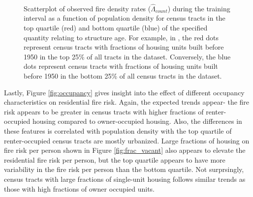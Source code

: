 \documentclass{svjour3}
\begin{document}
\begin{figure}[!ht]
\begin{center}
{          }
            \\
          
      \end{center}
      \caption{Scatterplot of observed fire density rates ($\hat\Lambda_{count}$) during the training interval as a function of population density for census tracts in the top quartile (red) and bottom quartile (blue) of the specified quantity relating to structure age. For example, in \protect{}, the red dots represent census tracts with fractions of housing units built before 1950 in the top 25\% of all tracts in the dataset. Conversely, the blue dots represent census tracts with fractions of housing units built before 1950 in the bottom 25\% of all census tracts in the dataset.}
     \label{fig:building age}
  \end{figure}
 
    Lastly, Figure \ref{fig:occupancy} gives insight into the effect of different occupancy characteristics on residential fire risk. Again, the expected trends appear- the fire risk appears to be greater in census tracts with higher fractions of renter-occupied housing compared to owner-occupied housing. Also, the differences in these features is correlated with population density with the top quartile of renter-occupied census tracts are mostly urbanized. Large fractions of housing on fire risk per person shown in Figure \ref{fig:frac_vacant} also appears to elevate the residential fire risk per person,  but the top quartile appears to have more variability in the fire risk per person than the bottom quartile. Not surprsingly, census tracts with large fractions of single-unit housing follows similar trends as those with high fractions of owner occupied units. 
 
\end{document}
